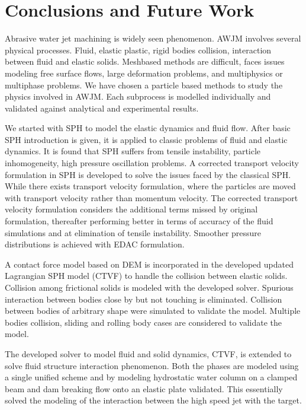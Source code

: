 \chapter{Conclusions and Future Work}
\label{chap:conclusions}

Abrasive water jet machining is widely seen phenomenon. AWJM involves several
physical processes. Fluid, elastic plastic, rigid bodies collision, interaction
between fluid and elastic solids. Meshbased methods are difficult, faces issues
modeling free surface flows, large deformation problems, and multiphysics or
multiphase problems. We have chosen a particle based methods to study the
physics involved in AWJM. Each subprocess is modelled individually and validated
against analytical and experimental results.

We started with SPH to model the elastic dynamics and fluid flow. After basic
SPH introduction is given, it is applied to classic problems of fluid and
elastic dynamics. It is found that SPH suffers from tensile instability,
particle inhomogeneity, high pressure oscillation problems. A corrected
transport velocity formulation in SPH is developed to solve the issues faced by
the classical SPH. While there exists transport velocity formulation, where the
particles are moved with transport velocity rather than momentum velocity. The
corrected transport velocity formulation considers the additional terms missed
by original formulation, thereafter performing better in terms of accuracy of
the fluid simulations and at elimination of tensile instability. Smoother
pressure distributions is achieved with EDAC formulation.

A contact force model based on DEM is incorporated in the developed updated
Lagrangian SPH model (CTVF) to handle the collision between elastic solids.
Collision among frictional solids is modeled with the developed solver. Spurious
interaction between bodies close by but not touching is eliminated. Collision
between bodies of arbitrary shape were simulated to validate the model. Multiple
bodies collision, sliding and rolling body cases are considered to validate the
model.


The developed solver to model fluid and solid dynamics, CTVF, is extended to
solve fluid structure interaction phenomenon. Both the phases are modeled using
a single unified scheme and by modeling hydrostatic water column on a clamped
beam and dam breaking flow onto an elastic plate validated. This essentially
solved the modeling of the interaction between the high speed jet with the
target.

